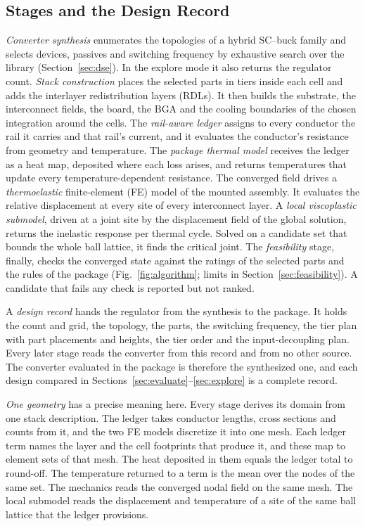 \subsection{Stages and the Design Record}\label{sec:fw-stages}
\emph{Converter synthesis} enumerates the topologies of a hybrid SC--buck family and selects
devices, passives and switching frequency by exhaustive search over the library
(Section~\ref{sec:dse}). In the explore mode it also returns the regulator count. \emph{Stack
construction} places the selected parts in tiers inside each cell and adds the interlayer
redistribution layers (RDLs). It then builds the substrate, the interconnect fields, the board,
the BGA and the cooling boundaries of the chosen integration around the cells. The
\emph{rail-aware ledger} assigns to every conductor the rail it carries and that rail's current,
and it evaluates the conductor's resistance from geometry and temperature. The \emph{package
thermal model} receives the ledger as a heat map, deposited where each loss arises, and returns
temperatures that update every temperature-dependent resistance. The converged field drives a
\emph{thermoelastic} finite-element (FE) model of the mounted assembly. It evaluates the relative
displacement at every site of every interconnect layer. A \emph{local viscoplastic submodel},
driven at a joint site by the displacement field of the global solution, returns the inelastic
response per thermal cycle. Solved on a candidate set that bounds the whole ball lattice, it finds
the critical joint. The \emph{feasibility} stage, finally, checks the converged state
against the ratings of the selected parts and the rules of the package
(Fig.~\ref{fig:algorithm}; limits in Section~\ref{sec:feasibility}). A candidate that fails any check
is reported but not ranked.

A \emph{design record} hands the regulator from the synthesis to the package. It holds the count
and grid, the topology, the parts, the switching frequency, the tier plan with part placements and
heights, the tier order and the input-decoupling plan. Every later stage reads the converter from
this record and from no other source. The converter evaluated in the package is therefore the
synthesized one, and each design compared in Sections~\ref{sec:evaluate}--\ref{sec:explore} is a
complete record.

\emph{One geometry} has a precise meaning here. Every stage derives its domain from one stack
description. The ledger takes conductor lengths, cross sections and counts from it, and the two FE
models discretize it into one mesh. Each ledger term names the layer and the cell footprints that
produce it, and these map to element sets of that mesh. The heat deposited in them equals the
ledger total to round-off. The temperature returned to a term is the mean over the
nodes of the same set. The mechanics reads the converged nodal field on the same mesh. The local
submodel reads the displacement and temperature of a site of the same ball lattice that the
ledger provisions.

